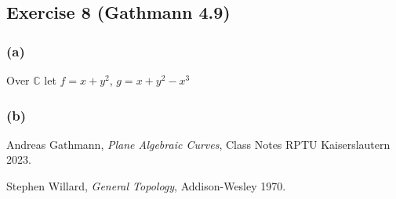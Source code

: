\documentclass[11pt,a4paper]{article}
\begin{document}
\subsection{Exercise 8 (Gathmann 4.9)}

\subsubsection*{(a)}
Over $ \mathbb C $ let $ f = x + y^2 $, $ g = x + y^2 - x^3 $ 

\subsubsection*{(b)}

\begin{thebibliography}{9}

  Andreas Gathmann,
  \textit{Plane Algebraic Curves},
  Class Notes RPTU Kaiserslautern 2023.

  Stephen Willard,
  \textit{General Topology},
  Addison-Wesley 1970.
  
\end{thebibliography}
\end{document}
